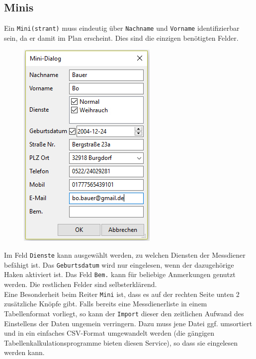\documentclass[a4paper,11pt]{article}
\begin{document}
\subsection{Minis}
Ein \texttt{Mini(strant)} muss eindeutig über \texttt{Nachname} und \texttt{Vorname} identifizierbar sein, da er damit im Plan erscheint. Dies sind die einzigen benötigten Felder.
\begin{figure}[h]
\includegraphics[scale=0.7]{messdiener2.PNG}
\end{figure}
Im Feld \texttt{Dienste} kann ausgewählt werden, zu welchen Diensten der Messdiener befähigt ist. Das \texttt{Geburtsdatum} wird nur eingelesen, wenn der dazugehörige Haken aktiviert ist. Das Feld \texttt{Bem.} kann für beliebige Anmerkungen genutzt werden. Die restlichen Felder sind selbsterklärend.\\
Eine Besonderheit beim Reiter \texttt{Mini} ist, dass es auf der rechten Seite unten 2 zusätzliche Knöpfe gibt. Falls bereits eine Messdienerliste in einem Tabellenformat vorliegt, so kann der \texttt{Import} dieser den zeitlichen Aufwand des Einstellens der Daten ungemein verringern. Dazu muss jene Datei ggf. umsortiert und in ein einfaches CSV-Format umgewandelt werden (die gängigen Tabellenkalkulationsprogramme bieten diesen Service), so dass sie eingelesen werden kann.
\end{document}
